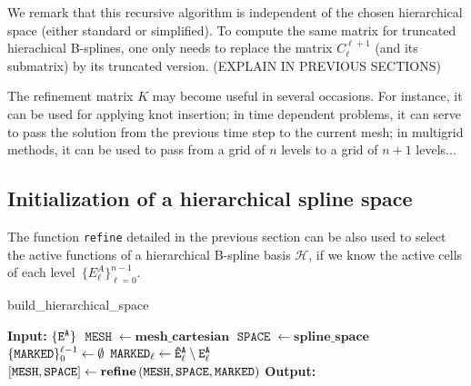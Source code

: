 \documentclass[a4paper]{siamltex1213}
\newcommand{\Rd}{\color{red}}
\newcommand{\activeelements}[1]{\tt E^A_{#1}}
\DeclareMathOperator\mesh{\texttt{MESH}}
\DeclareMathOperator\basis{\texttt{SPACE}}
\DeclareMathOperator\marked{\tt MARKED}
\newcommand\QQ{\mathcal Q}
\newcommand\HH{\mathcal H}
\begin{document}
We remark that this recursive algorithm is independent of the chosen hierarchical space (either standard or simplified). To compute the same matrix for truncated hierachical B-splines, one only needs to replace the matrix $C_\ell^{\ell+1}$ (and its submatrix) by its truncated version. {\Rd (EXPLAIN IN PREVIOUS SECTIONS)}

The refinement matrix $K$ may become useful in several occasions. For instance, it can be used for applying knot insertion; in time dependent problems, it can serve to pass the solution from the previous time step to the current mesh; in multigrid methods, it can be used to pass from a grid of $n$ levels to a grid of $n+1$ levels...

\subsection{Initialization of a hierarchical spline space}

The function \texttt{refine} detailed in the previous section can be also used to select the active functions of a hierarchical B-spline basis $\HH$, if we know the active cells of each level~$\{E^A_\ell\}_{\ell=0}^{n-1}$. 

\begin{algorithm}
\caption{build\_hierarchical\_space}
\begin{algorithmic}[1]
\Statex \textbf{Input:} $\{\activeelements{ }\}$
\State $\mesh \gets \textbf{mesh\_cartesian}$  
\State $\basis \gets \textbf{spline\_space}$  
  \State $\{\marked\}_0^{\ell-1} \gets \emptyset$
  \State $\marked_\ell \gets \tt{\hat E^A_\ell} \setminus \activeelements{\ell}$
  \State $[\mesh, \basis] \gets \textbf{refine} \, (\mesh, \basis, \marked)$
\EndFor
\Statex \textbf{Output:}
\end{algorithmic}
\end{algorithm}


\end{document}
